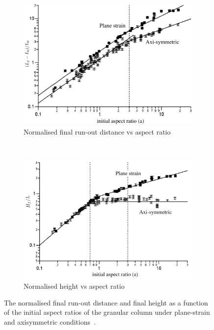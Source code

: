 \begin{figure}[tbhp]
\centering
	\begin{subfigure}[b]{0.85\textwidth}
	\centering
	\includegraphics[width=\textwidth]{Runout_Exp}
	\caption{Normalised final run-out distance vs aspect ratio}
	\label{fig:Runout_Exp}
	\end{subfigure} \\

	\begin{subfigure}[b]{0.85\textwidth}
	\centering
	\includegraphics[width=\textwidth]{Height_Exp}
	\caption{Normalised height vs aspect ratio}
	\label{fig:Height_Exp}
	\end{subfigure}
	\label{fig:Run_Height_Exp}
	\caption[Normalised final run-out and height as a function of initial aspect ratio for 
	plane-strain and axisymmetric collapse]{The normalised final run-out 
	distance and final height 
	as a function of the initial aspect ratios of the granular column under plane-strain 
	and axisymmetric conditions~\citep{Lajeunesse2004}.}
\end{figure}

